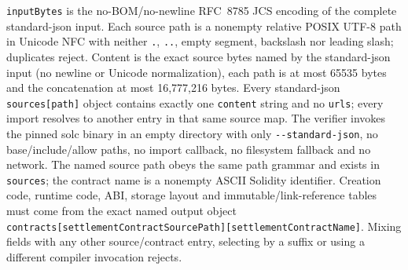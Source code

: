 \documentclass[a4paper,11pt]{article}
\newcommand{\code}[1]{\nolinkurl{#1}}
\begin{document}
\code{inputBytes} is the no-BOM/no-newline RFC~8785 JCS encoding of the complete
standard-json input.  Each source path is a nonempty relative POSIX UTF-8 path
in Unicode NFC with neither \code{.}, \code{..}, empty segment, backslash nor
leading slash; duplicates reject.  Content is the exact source bytes named by
the standard-json input (no newline or Unicode normalization), each path is at
most 65535 bytes and the concatenation at most 16,777,216 bytes.
Every standard-json \code{sources[path]} object contains exactly one
\code{content} string and no \code{urls}; every import resolves to another
entry in that same source map.  The verifier invokes the pinned solc binary in
an empty directory with only \code{--standard-json}, no base/include/allow
paths, no import callback, no filesystem fallback and no network.  The named
source path obeys the same path grammar and exists in \code{sources}; the
contract name is a nonempty ASCII Solidity identifier.  Creation code, runtime
code, ABI, storage layout and immutable/link-reference tables must come from
the exact named output object
\code{contracts[settlementContractSourcePath][settlementContractName]}.
Mixing fields with any other source/contract entry, selecting by a suffix or
using a different compiler invocation rejects.
\end{document}
